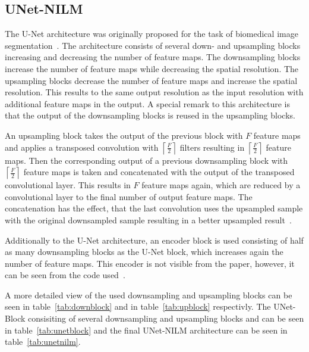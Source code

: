 \documentclass[sigconf]{acmart}
\begin{document}
\subsection{UNet-NILM}
The U-Net architecture was originally proposed for the task of biomedical image segmentation~\cite{unet}.
The architecture consists of several down- and upsampling blocks increasing and decreasing the number of feature maps.
The downsampling blocks increase the number of feature maps while decreasing the spatial resolution.
The upsampling blocks decrease the number of feature maps and increase the spatial resolution.
This results to the same output resolution as the input resolution with additional feature maps in the output.
A special remark to this architecture is that the output of the downsampling blocks is reused in the upsampling blocks.

An upsampling block takes the output of the previous block with $F$ feature maps
and applies a transposed convolution with $\left\lceil\frac{F}{2} \right\rceil$ filters 
resulting in $\left\lceil\frac{F}{2} \right\rceil$ feature maps. Then the corresponding output 
of a previous downsampling block with $\left\lceil\frac{F}{2} \right\rceil$ feature maps is taken and concatenated with the output of the transposed convolutional layer. This results 
in $F$ feature maps again, which are reduced by a convolutional layer to the final number of output feature maps.
The concatenation has the effect, that the last convolution uses the upsampled sample with the original downsampled sample
resulting in a better upsampled result~\cite{unet}.

Additionally to the U-Net architecture, an encoder block is used consisting of half as many downsampling blocks as the U-Net block, which 
increases again the number of feature maps.
This encoder is not visible from the paper, however, it can be seen from the code used~\cite{unetrepo}.

A more detailed view of the used downsampling and upsampling blocks can be seen in table~\ref{tab:downblock} and in table~\ref{tab:upblock}
respectivly. The UNet-Block consisiting of several downsampling and upsampling blocks and can be seen in table~\ref{tab:unetblock} and
the final UNet-NILM architecture can be seen in table~\ref{tab:unetnilm}.
\end{document}
